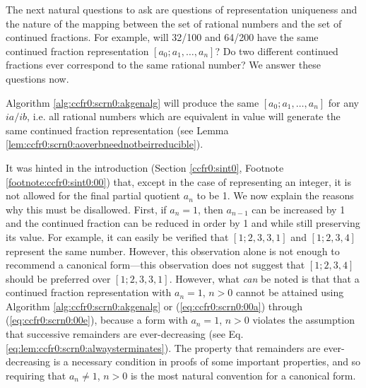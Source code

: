 The next natural questions to ask are questions of representation 
uniqueness and the nature of the mapping between the set of rational numbers
and the set of continued fractions.  For example, will 32/100 and 64/200 have
the same continued fraction representation $[a_0; a_1, \ldots{} , a_n]$?  
Do two different continued fractions ever correspond
to the same rational number?  We answer these questions now.

Algorithm \ref{alg:ccfr0:scrn0:akgenalg} will produce the
same $[a_0; a_1, \ldots{} , a_n]$ for any $ia/ib$, i.e. all rational numbers
which are equivalent in value will generate the same continued fraction 
representation (see Lemma \ref{lem:ccfr0:scrn0:aoverbneednotbeirreducible}).

It was hinted in the introduction (Section 
\ref{ccfr0:sint0}, Footnote \ref{footnote:ccfr0:sint0:00})
that, except in the case of representing an integer, it is 
not allowed for the final partial quotient $a_n$ to be 1.
We now explain the reasons why this must be disallowed.  First,
if $a_n = 1$, then $a_{n-1}$ can be increased by 1 and
the continued fraction can be reduced in order
by 1 and while still preserving its value.  For example, it
can easily be verified that $[1;2,3,3,1]$ and $[1;2,3,4]$
represent the same number.  However, this observation alone
is not enough to recommend a canonical form---this observation
does not suggest that  $[1;2,3,4]$ should be preferred
over $[1;2,3,3,1]$.  However, what \emph{can} be noted is that
that a continued fraction representation with $a_n=1$, $n>0$
cannot be attained using Algorithm \ref{alg:ccfr0:scrn0:akgenalg} or
(\ref{eq:ccfr0:scrn0:00a}) through (\ref{eq:ccfr0:scrn0:00e}),
because a form with $a_n=1$, $n>0$ violates the assumption that
successive remainders are ever-decreasing (see Eq. 
\ref{eq:lem:ccfr0:scrn0:alwaysterminates}).  The property that
remainders are ever-decreasing is a necessary condition in
proofs of some important properties, and so requiring
that $a_n \neq{} 1$, $n>0$
is the most natural convention for a canonical form.

